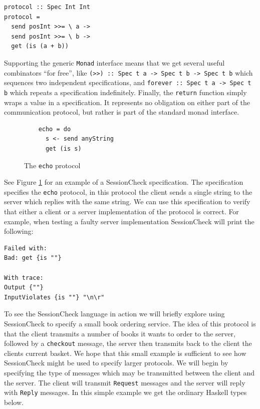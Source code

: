 \documentclass{article}
\begin{document}
\begin{verbatim}
protocol :: Spec Int Int
protocol =
  send posInt >>= \ a ->
  send posInt >>= \ b ->
  get (is (a + b))
\end{verbatim}


%
Supporting the generic \texttt{Monad} interface means that we get several useful combinators ``for free'', like
\texttt{(>>) :: Spec t a -> Spec t b -> Spec t b} which sequences two independent specifications, and
\texttt{forever :: Spec t a -> Spec t b} which repeats a specification indefinitely.
%
Finally, the \texttt{return} function simply wraps a value in a specification.
%
It represents no obligation on either part of the communication protocol, but rather is part of the standard
monad interface.
%

\begin{figure}
  \begin{verbatim}
    echo = do
      s <- send anyString
      get (is s)
  \end{verbatim}
  \caption{\label{fig:SessionCheck:echo} The \texttt{echo} protocol}
\end{figure}

See Figure \ref{fig:SessionCheck:echo} for an example of a SessionCheck specification.
%
The specification specifies the \texttt{echo} protocol, in this protocol the client sends
a single string to the server which replies with the same string.
%
We can use this specification to verify that either a client or a server implementation of
the protocol is correct.
%
For example, when testing a faulty server implementation SessionCheck will print the following:
%
\begin{verbatim}
Failed with:
Bad: get {is ""}

With trace:
Output {""}
InputViolates {is ""} "\n\r"
\end{verbatim}

To see the SessionCheck language in action we will briefly explore using SessionCheck
to specify a small book ordering service.
%
The idea of this protocol is that the client transmits a number of books it wants to order to the
server, followed by a \texttt{checkout} message, the server then transmits back to the client
the clients current basket. 
%
We hope that this small example is sufficient to see how SessionCheck might be used to
specify larger protocols.
%
We will begin by specifying the type of messages which may be transmitted between the client and the
server.
%
The client will transmit \texttt{Request} messages and the server will reply with \texttt{Reply} messages.
%
In this simple example we get the ordinary Haskell types below.
\end{document}
